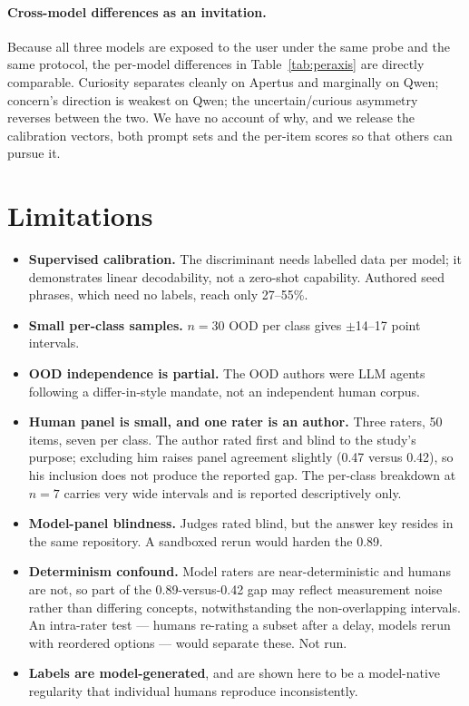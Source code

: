 \documentclass[11pt]{article}
\begin{document}
\paragraph{Cross-model differences as an invitation.} Because all three models are exposed to the
user under the same probe and the same protocol, the per-model differences in
Table~\ref{tab:peraxis} are directly comparable. Curiosity separates cleanly on Apertus and
marginally on Qwen; concern's direction is weakest on Qwen; the uncertain/curious asymmetry
reverses between the two. We have no account of why, and we release the calibration vectors, both
prompt sets and the per-item scores so that others can pursue it.

\section{Limitations}

\begin{itemize}
\item \textbf{Supervised calibration.} The discriminant needs labelled data per model; it
  demonstrates linear decodability, not a zero-shot capability. Authored seed phrases, which need
  no labels, reach only 27--55\%.
\item \textbf{Small per-class samples.} $n=30$ OOD per class gives $\pm$14--17 point intervals.
\item \textbf{OOD independence is partial.} The OOD authors were LLM agents following a
  differ-in-style mandate, not an independent human corpus.
\item \textbf{Human panel is small, and one rater is an author.} Three raters, 50 items, seven
  per class. The author rated first and blind to the study's purpose; excluding him raises panel
  agreement slightly (0.47 versus 0.42), so his inclusion does not produce the reported gap. The
  per-class breakdown at $n=7$ carries very wide intervals and is reported descriptively only.
\item \textbf{Model-panel blindness.} Judges rated blind, but the answer key resides in the same
  repository. A sandboxed rerun would harden the 0.89.
\item \textbf{Determinism confound.} Model raters are near-deterministic and humans are not, so
  part of the 0.89-versus-0.42 gap may reflect measurement noise rather than differing concepts,
  notwithstanding the non-overlapping intervals.
  An intra-rater test --- humans re-rating a subset after a delay, models rerun with reordered
  options --- would separate these. Not run.
\item \textbf{Labels are model-generated}, and are shown here to be a model-native regularity that
  individual humans reproduce inconsistently.
\end{itemize}
\end{document}
